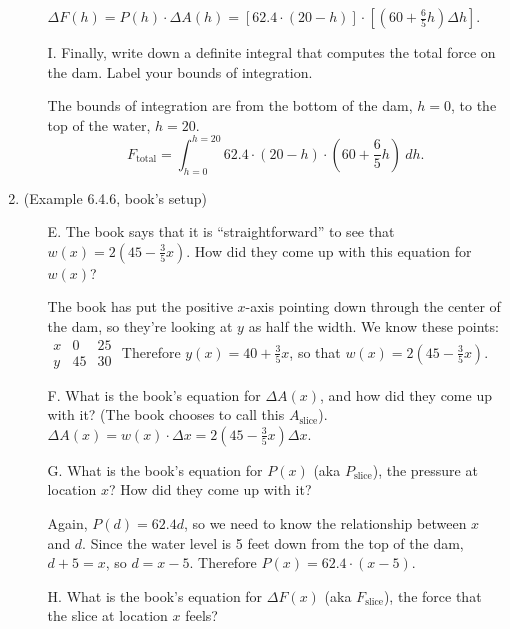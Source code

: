 \documentclass[10pt]{article}
\newcommand{\slice}{_\text{slice}}
\newenvironment{red}{\color{red}}{\ignorespacesafterend}
\begin{document}
\begin{enumerate}[leftmargin=0pt]
\begin{enumerate}
    \begin{red}
        $\Delta F(h) = P(h)\cdot\Delta A(h) = 
        \left[ 62.4\cdot(20-h) \right]\cdot\left[(60 + \tfrac65 h)\Delta h\right]$.
    \end{red}
    \item[I.] Finally, write down a definite integral that computes the total force on the dam. Label your bounds of integration.

    \begin{red}
    The bounds of integration are from the bottom of the dam, $h=0$, to the top of the water, $h=20$.
        \[F_\text{total} = \int_{h=0}^{h=20}62.4\cdot(20-h) \cdot \left(60 + \dfrac65 h\right)\ dh.\]
    \end{red}
\end{enumerate}
\vspace{-2em}
\item (Example 6.4.6, book's setup)
\begin{enumerate}
    \item[E.] The book says that it is ``straightforward'' to see that $w(x) = 2\left(45 - \tfrac35 x\right)$. How did they come up with this equation for $w(x)$?
    
    \begin{red}
        The book has put the positive $x$-axis pointing down through the center of the dam, so they're looking at $y$ as half the width. We know these points:
        $
\begin{array}{l||ll}
x & 0  & 25 \\\hline
y & 45 & 30
\end{array}
        $\quad
        Therefore $y(x) = 40 + \tfrac35 x$, so that $w(x) = 2\left(45 - \tfrac35 x\right)$. 
    \end{red}
    \item[F.] What is the book's equation for $\Delta A(x)$, and how did they come up with it? (The book chooses to call this $A\slice$).
    \begin{red}
        $\Delta A(x) = w(x)\cdot\Delta x =  2\left(45 - \tfrac35 x\right)\Delta x$. 
    \end{red}
    \item[G.] What is the book's equation for $P(x)$ (aka $P\slice$), the pressure at location $x$? How did they come up with it?

    \begin{red}
        Again, $P(d) = 62.4d$, so we need to know the relationship between $x$ and $d$. Since the water level is 5 feet down from the top of the dam, $d+5=x$, so $d = x-5$. Therefore $P(x) = 62.4\cdot(x-5)$.
    \end{red}
    \item[H.] What is the book's equation for $\Delta F(x)$ (aka $F\slice$), the force that the slice at location $x$ feels?
    

\end{enumerate}
\end{enumerate}
\end{document}
